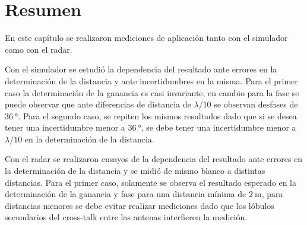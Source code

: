 \section{Resumen}

En este capítulo se realizaron mediciones de aplicación tanto con el simulador como con el radar.

Con el simulador se estudió la dependencia del resultado ante errores en la determinación de la distancia y ante incertidumbres en la misma. Para el primer caso la determinación de la ganancia es casi invariante, en cambio para la fase se puede observar que ante diferencias de distancia de $\lambda / 10$ se observan desfases de $\SI{36}{\degree}$. Para el segundo caso, se repiten los mismos resultados dado que si se desea tener una incertidumbre menor a $\SI{36}{\degree}$, se debe tener una incertidumbre menor a $\lambda / 10$ en la determinación de la distancia.

Con el radar se realizaron ensayos de la dependencia del resultado ante errores en la determinación de la distancia y se midió de mismo blanco a distintas distancias. Para el primer caso, solamente se observa el resultado esperado en la determinación de la ganancia y fase para una distancia mínima de $\SI{2}{\meter}$, para distancias menores se debe evitar realizar mediciones dado que los lóbulos secundarios del cross-talk entre las antenas interfieren la medición.